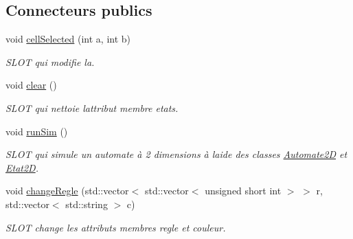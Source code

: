 \subsection*{Connecteurs publics}
\begin{DoxyCompactItemize}
\item 
void \hyperlink{class_autocell2_d_a08c17fc3e2ddf15173303d9e0d156e6e}{cell\+Selected} (int a, int b)
\begin{DoxyCompactList}\small\item\em S\+L\+OT qui modifie la. \end{DoxyCompactList}\item 
void \hyperlink{class_autocell2_d_ad698bee76cfdc81977864cd3db37ec2d}{clear} ()
\begin{DoxyCompactList}\small\item\em S\+L\+OT qui nettoie l\textquotesingle{}attribut membre etats. \end{DoxyCompactList}\item 
void \hyperlink{class_autocell2_d_aa5a7971b56710d08d3791a0c1b2a2c2e}{run\+Sim} ()
\begin{DoxyCompactList}\small\item\em S\+L\+OT qui simule un automate à 2 dimensions à l\textquotesingle{}aide des classes \hyperlink{class_automate2_d}{Automate2D} et \hyperlink{class_etat2_d}{Etat2D}. \end{DoxyCompactList}\item 
void \hyperlink{class_autocell2_d_acd5a8f9543affc825ddc82d840de7b42}{change\+Regle} (std\+::vector$<$ std\+::vector$<$ unsigned short int $>$ $>$ r, std\+::vector$<$ std\+::string $>$ c)
\begin{DoxyCompactList}\small\item\em S\+L\+OT change les attributs membres regle et couleur. \end{DoxyCompactList}\end{DoxyCompactItemize}
